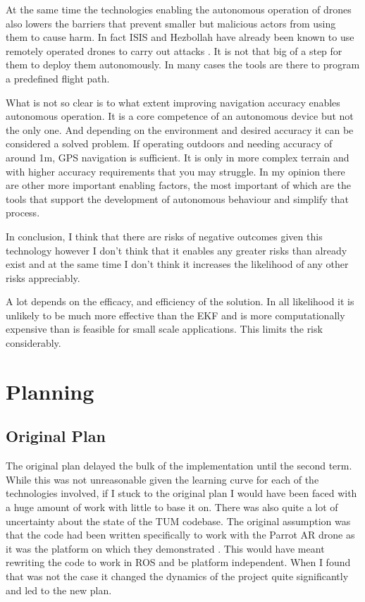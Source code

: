 \documentclass[]{../resources/final_report}
\begin{document}
At the same time the technologies enabling the autonomous operation of drones also lowers the barriers 
that prevent smaller but malicious actors from using them to cause harm. In fact ISIS and Hezbollah 
have already been known to use remotely operated drones to carry out attacks \cite{plaw_santoro_2017}\cite{warrick_2017}. 
It is not that big of a step for them to deploy them autonomously. In many cases the tools are there to 
program a predefined flight path.

What is not so clear is to what extent improving navigation accuracy enables autonomous operation. 
It is a core competence of an autonomous device \cite{Autonomous_robot} but not the only one. And depending on the 
environment and desired accuracy it can be considered a solved problem. If operating outdoors and 
needing accuracy of around 1m, GPS navigation is sufficient. It is only in more complex terrain and 
with higher accuracy requirements that you may struggle. In my opinion there are other more important 
enabling factors, the most important of which are the tools that support the development of autonomous 
behaviour and simplify that process.

In conclusion, I think that there are risks of negative outcomes given this technology however I don’t 
think that it enables any greater risks than already exist and at the same time I don’t think it increases 
the likelihood of any other risks appreciably.

A lot depends on the efficacy, and efficiency of the solution. In all likelihood it is unlikely to be 
much more effective than the EKF and is more computationally expensive than is feasible for small scale 
applications. This limits the risk considerably.


\chapter{Planning}

\section{Original Plan}

The original plan delayed the bulk of the implementation until the second term. While this was 
not unreasonable given the learning curve for each of the technologies involved, if I stuck to 
the original plan I would have been faced with a huge amount of work with little to base it on.
There was also quite a lot of uncertainty about the state of the TUM codebase. The original 
assumption was that the code had been written specifically to work with the Parrot AR drone as 
it was the platform on which they demonstrated \cite{Engel:Camera-basedNav}.
This would have meant rewriting the code to work in ROS and be platform independent. When I found 
that was not the case it changed the dynamics of the project quite significantly and led to the 
new plan.
\end{document}
